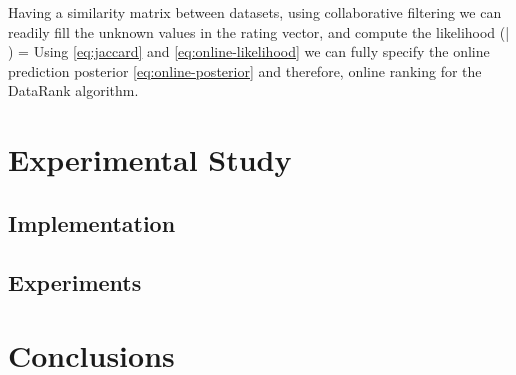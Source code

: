 \documentclass{amia}
\begin{document}
Having a similarity matrix between datasets, using collaborative filtering we can readily fill the unknown values in the rating vector, and compute the likelihood
\beq \label{eq:online-likelihood}
\pr(\bfz | \bfr) = 
\eeq
Using \eqref{eq:jaccard} and \eqref{eq:online-likelihood} we can fully specify the online prediction posterior \eqref{eq:online-posterior} and therefore, online ranking for the DataRank algorithm.

\section{Experimental Study} \label{sec:Experiments}
\subsection{Implementation}
\subsection{Experiments}
\section{Conclusions} \label{sec:conclusions}



\makeatletter
\renewcommand{\@biblabel}[1]{\hfill #1.}
\makeatother


%  

\end{document}
